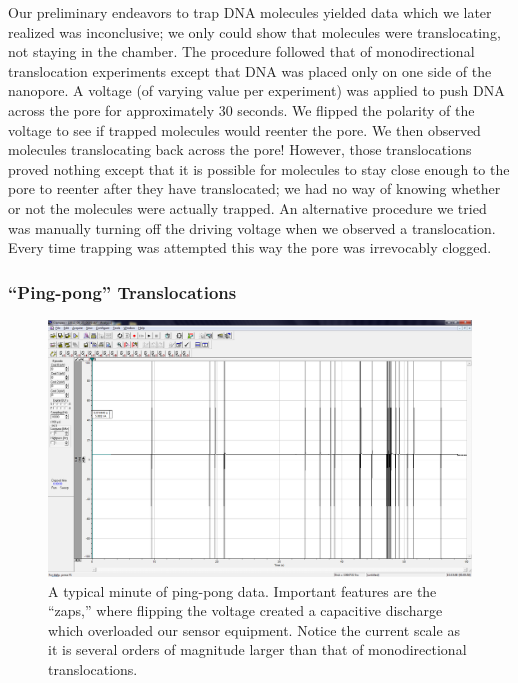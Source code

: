 \documentclass[aps,prl,preprint,groupedaddress]{revtex4}
\begin{document}
Our preliminary endeavors to trap DNA molecules yielded data which we later realized was inconclusive; we only could show that molecules were translocating, not staying in the chamber.
The procedure followed that of monodirectional translocation experiments except that DNA was placed only on one side of the nanopore.
A voltage (of varying value per experiment) was applied to push DNA across the pore for approximately 30 seconds.
We flipped the polarity of the voltage to see if trapped molecules would reenter the pore.
We then observed molecules translocating back across the pore!
However, those translocations proved nothing except that it is possible for molecules to stay close enough to the pore to reenter after they have translocated; we had no way of knowing whether or not the molecules were actually trapped.
An alternative procedure we tried was manually turning off the driving voltage when we observed a translocation.
Every time trapping was attempted this way the pore was irrevocably clogged.

\subsubsection{``Ping-pong'' Translocations}

\begin{figure}[h]
\centering
\includegraphics[width=1\textwidth]{figures/ping-pong-minute}
\caption{A typical minute of ping-pong data.
Important features are the ``zaps,'' where flipping the voltage created a capacitive discharge which overloaded our sensor equipment.
Notice the current scale as it is several orders of magnitude larger than that of monodirectional translocations.}
\label{fig:ping-pong-data}
\end{figure}
\end{document}
